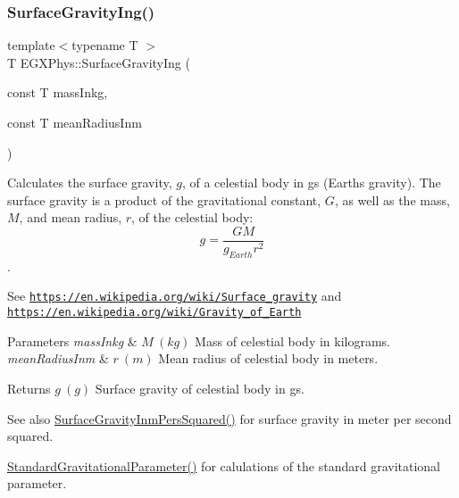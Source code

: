 \subsubsection{\texorpdfstring{Surface\+Gravity\+Ing()}{SurfaceGravityIng()}}
{\footnotesize\ttfamily template$<$typename T $>$ \\
T E\+G\+X\+Phys\+::\+Surface\+Gravity\+Ing (\begin{DoxyParamCaption}\item[{const T}]{mass\+Inkg,  }\item[{const T}]{mean\+Radius\+Inm }\end{DoxyParamCaption})}



Calculates the surface gravity, $g$, of a celestial body in gs (Earth\textquotesingle{}s gravity). The surface gravity is a product of the gravitational constant, $G$, as well as the mass, $M$, and mean radius, $r$, of the celestial body\+: \[g = \frac{GM}{g_{Earth}r^2}\]. 

See \href{https://en.wikipedia.org/wiki/Surface_gravity}{\tt https\+://en.\+wikipedia.\+org/wiki/\+Surface\+\_\+gravity} and \href{https://en.wikipedia.org/wiki/Gravity_of_Earth}{\tt https\+://en.\+wikipedia.\+org/wiki/\+Gravity\+\_\+of\+\_\+\+Earth}


\begin{DoxyParams}{Parameters}
{\em mass\+Inkg} & $M\ (kg)$ Mass of celestial body in kilograms. \\
\hline
{\em mean\+Radius\+Inm} & $r\ (m)$ Mean radius of celestial body in meters. \\
\hline
\end{DoxyParams}
\begin{DoxyReturn}{Returns}
$g\ (g)$ Surface gravity of celestial body in gs. 
\end{DoxyReturn}
\begin{DoxySeeAlso}{See also}
\mbox{\hyperlink{group___e_g_x_phys-_astrophysics-_surface_gravity_gaf7e1f42b674fe8bb2211c40882a7d5b6}{Surface\+Gravity\+Inm\+Pers\+Squared()}} for surface gravity in meter per second squared. 

\mbox{\hyperlink{group___e_g_x_phys-_astrophysics-_standard_gravitational_parameter_ga37f4ed78b0fc23603b49ade3e435ea20}{Standard\+Gravitational\+Parameter()}} for calulations of the standard gravitational parameter. 
\end{DoxySeeAlso}
\mbox{\label{group___e_g_x_phys-_astrophysics-_surface_gravity_gaf7e1f42b674fe8bb2211c40882a7d5b6}} 
